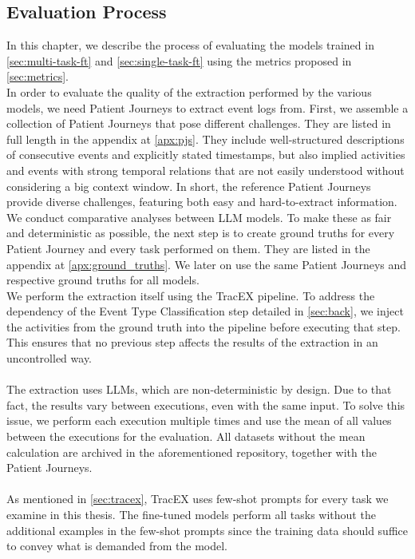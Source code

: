\subsection{Evaluation Process}\label{sec:eval_process}
In this chapter, we describe the process of evaluating the models trained in \autoref{sec:multi-task-ft} and \autoref{sec:single-task-ft} using the metrics proposed in \autoref{sec:metrics}.\\
In order to evaluate the quality of the extraction performed by the various models, we need Patient Journeys to extract event logs from. First, we assemble a collection of Patient Journeys that pose different challenges. They are listed in full length in the appendix at \ref{apx:pjs}. They include well-structured descriptions of consecutive events and explicitly stated timestamps, but also implied activities and events with strong temporal relations that are not easily understood without considering a big context window. In short, the reference Patient Journeys provide diverse challenges, featuring both easy and hard-to-extract information.\\
We conduct comparative analyses between LLM models. To make these as fair and deterministic as possible, the next step is to create ground truths for every Patient Journey and every task performed on them. They are listed in the appendix at \ref{apx:ground_truths}. We later on use the same Patient Journeys and respective ground truths for all models.\\
We perform the extraction itself using the TracEX pipeline. To address the dependency of the Event Type Classification step detailed in \autoref{sec:back}, we inject the activities from the ground truth into the pipeline before executing that step. This ensures that no previous step affects the results of the extraction in an uncontrolled way.\\\\
The extraction uses LLMs, which are non-deterministic by design. Due to that fact, the results vary between executions, even with the same input. To solve this issue, we perform each execution multiple times and use the mean of all values between the executions for the evaluation. All datasets without the mean calculation are archived in the aforementioned repository, together with the Patient Journeys.\\\\
As mentioned in \autoref{sec:tracex}, TracEX uses few-shot prompts for every task we examine in this thesis. The fine-tuned models perform all tasks without the additional examples in the few-shot prompts since the training data should suffice to convey what is demanded from the model.\\

